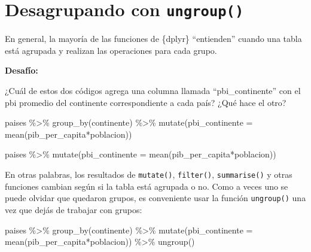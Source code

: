 \documentclass[
  openany]{book}
\newenvironment{Shaded}{\begin{snugshade}}{\end{snugshade}}
\newcommand{\AttributeTok}[1]{\textcolor[rgb]{0.77,0.63,0.00}{#1}}
\newcommand{\FunctionTok}[1]{\textcolor[rgb]{0.00,0.00,0.00}{#1}}
\newcommand{\NormalTok}[1]{#1}
\newcommand{\SpecialCharTok}[1]{\textcolor[rgb]{0.00,0.00,0.00}{#1}}
\begin{document}
\hypertarget{desagrupando-con-ungroup}{%
\section{\texorpdfstring{Desagrupando con \texttt{ungroup()}}{Desagrupando con ungroup()}}\label{desagrupando-con-ungroup}}

En general, la mayoría de las funciones de \{dplyr\} ``entienden'' cuando una tabla está agrupada y realizan las operaciones para cada grupo.

\textbf{Desafío:}

¿Cuál de estos dos códigos agrega una columna llamada ``pbi\_continente'' con el pbi promedio del continente correspondiente a cada país?
¿Qué hace el otro?

\begin{Shaded}
\begin{Highlighting}[]
\NormalTok{paises }\SpecialCharTok{\%\textgreater{}\%} 
  \FunctionTok{group\_by}\NormalTok{(continente) }\SpecialCharTok{\%\textgreater{}\%} 
  \FunctionTok{mutate}\NormalTok{(}\AttributeTok{pbi\_continente =} \FunctionTok{mean}\NormalTok{(pib\_per\_capita}\SpecialCharTok{*}\NormalTok{poblacion)) }

\NormalTok{paises }\SpecialCharTok{\%\textgreater{}\%} 
  \FunctionTok{mutate}\NormalTok{(}\AttributeTok{pbi\_continente =} \FunctionTok{mean}\NormalTok{(pib\_per\_capita}\SpecialCharTok{*}\NormalTok{poblacion)) }
\end{Highlighting}
\end{Shaded}

En otras palabras, los resultados de \texttt{mutate()}, \texttt{filter()}, \texttt{summarise()} y otras funciones cambian según si la tabla está agrupada o no.
Como a veces uno se puede olvidar que quedaron grupos, es conveniente usar la función \texttt{ungroup()} una vez que dejás de trabajar con grupos:

\begin{Shaded}
\begin{Highlighting}[]
\NormalTok{paises }\SpecialCharTok{\%\textgreater{}\%} 
  \FunctionTok{group\_by}\NormalTok{(continente) }\SpecialCharTok{\%\textgreater{}\%} 
  \FunctionTok{mutate}\NormalTok{(}\AttributeTok{pbi\_continente =} \FunctionTok{mean}\NormalTok{(pib\_per\_capita}\SpecialCharTok{*}\NormalTok{poblacion)) }\SpecialCharTok{\%\textgreater{}\%} 
  \FunctionTok{ungroup}\NormalTok{()}
\end{Highlighting}
\end{Shaded}
\end{document}
